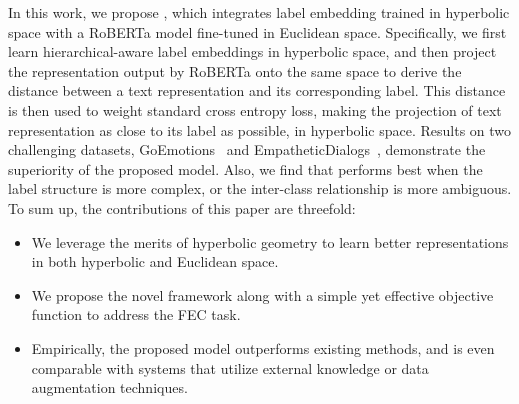 In this work, we propose \modelname, which integrates label embedding trained
in hyperbolic space with a RoBERTa model fine-tuned in Euclidean space.
Specifically, we first learn hierarchical-aware label embeddings in 
hyperbolic space, and then project the representation output by RoBERTa onto
the same space to derive the distance between a text representation and its
corresponding label. This distance is then used to weight standard cross
entropy loss, making the projection of text representation as close to its
label as possible, in hyperbolic space. 
Results on two challenging datasets,
GoEmotions~\cite{demszky-etal-2020-goemotions} and
EmpatheticDialogs~\cite{rashkin-etal-2019-towards}, demonstrate the superiority of the
proposed model. Also, we find that \wsmodelname performs best when the
label structure is more complex, or the inter-class relationship is more
ambiguous.
To sum up, the contributions of this paper are threefold:
\begin{itemize}
	 \item We leverage the merits of hyperbolic geometry to learn better
	 representations in both hyperbolic and Euclidean space. 
	 \item We propose the novel \wsmodelname framework along with a simple yet
	 effective objective function to address the FEC task.
	 \item Empirically, the proposed model outperforms existing methods, and
	 is even comparable with systems that utilize external knowledge or data
	 augmentation techniques. 
\end{itemize}
